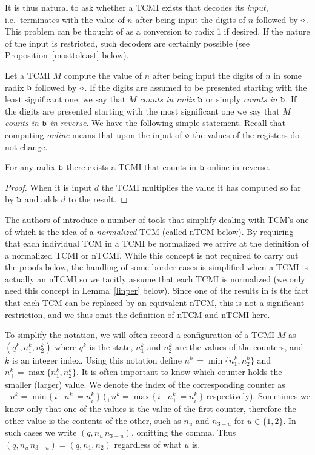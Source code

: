 \documentclass[12pt]{article}
\begin{document}
It is thus natural to ask whether a TCMI exists that decodes its
{\it input\/}, i.e.~terminates with the value of $n$ after being input the
digits of $n$ followed by $\diamond$. This problem can be thought of as a
conversion to radix 1 if desired. If the nature of the input is
restricted, such decoders are certainly possible (see
Proposition~\ref{mosttoleast} below). 


Let a TCMI $M$ compute the value of $n$ after being input the
digits of $n$ in some radix ${\tt b}$ followed by $\diamond$. If the digits
are assumed to be presented starting with the least significant one,
we say that $M$ {\it counts in radix ${\tt b}$\/} or simply {\it counts
  in ${\tt b}$\/}. If the digits are presented starting with the most
significant one we say that $M$ {\it counts in ${\tt b}$ in reverse}.
We have the following simple statement. Recall that computing {\it
  online\/} means that upon the input of $\diamond$ the values of the
registers do not change.
\begin{proposition}\label{mosttoleast}
For any radix ${\tt b}$ there exists a TCMI that counts in ${\tt b}$ online
in reverse.
\end{proposition}
\begin{proof}
When it is input $d$ the TCMI multiplies the value it has computed so
far by ${\tt b}$ and adds $d$ to the result.
\end{proof}

The authors of \cite{ibarra} introduce a number of tools that simplify
dealing with TCM's one of which is the idea of a {\it normalized\/}
TCM (called nTCM below). By requiring that each individual TCM in a TCMI be
normalized we arrive at the definition of a normalized TCMI or
nTCMI. While this concept is not required to carry out the proofs
below, the handling of some border cases is simplified when a TCMI is
actually an nTCMI so we tacitly assume that each TCMI is normalized
(we only need this concept in Lemma~\ref{linper} below). Since one of
the results in \cite{ibarra} is the fact that each TCM can be replaced
by an equivalent nTCM, this is not a significant restriction, and we
thus omit the definition of nTCM  and nTCMI here.

To simplify the notation, we will often record a configuration of a
TCMI $M$ as $(q^k,n^k_1,n^k_2)$ where $q^k$ is the state, $n^k_1$ and $n^k_2$
are the values of the counters, and $k$ is an integer index. Using this notation
define $n^k_-=\min\{n^k_1,n^k_2\}$ and $n^k_+=\max\{n^k_1, n^k_2\}$. It is
often important to know which counter holds the smaller (larger)
value. We denote the index of the corresponding
counter as ${}_-n^k=\min\{\,i\mid n^k_-=n^k_i\,\}$
(${}_+n^k=\max\{\,i\mid n^k_+=n^k_i\,\}$ respectively). Sometimes we
know only that one of the values is the value of the first counter,
therefore the other value is the contents of the other, such as $n_u$
and $n_{3-u}$ for $u\in\{1,2\}$. In such cases we write
$(q,n_u\,n_{3-u})$, omitting the comma. Thus $(q, n_u\, n_{3-u})=(q,
n_1, n_2)$ regardless of what $u$ is.
\end{document}
